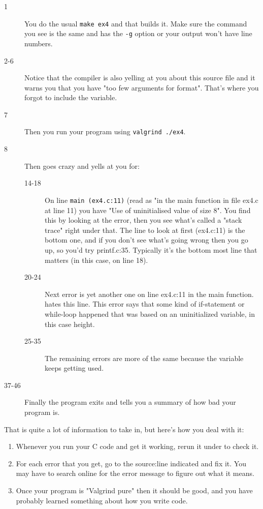 \begin{description}
\item[1] You do the usual \verb|make ex4| and that builds it. Make sure the  command
    you see is the same and has the \verb|-g| option or your  output won't
    have line numbers.
\item[2-6] Notice that the compiler is also yelling at you about this source file and it
    warns you that you have "too few arguments for format".  That's where you 
    forgot to include the  variable.
\item[7] Then you run your program using \verb|valgrind ./ex4|.
\item[8] Then  goes crazy and yells at you for:
    \begin{description}
        \item[14-18] On line \verb|main (ex4.c:11)| (read as "in the main function in
            file ex4.c at line 11) you have "Use of uninitialised value of size 8".
            You find this by looking at the error, then you see what's called a "stack trace"
            right under that.  The line to look at first (ex4.c:11) is the bottom one, 
            and if you don't see what's going wrong then you go up, so you'd try
            printf.c:35.  Typically it's the bottom most line that matters (in this case, on line 18).
        \item[20-24] Next error is yet another one on line ex4.c:11 in the main function. 
            hates this line.  This error says that some kind of if-statement or while-loop
            happened that was based on an uninitialized variable, in this case height.
        \item[25-35] The remaining errors are more of the same because the variable keeps getting
        used.
    \end{description}
\item[37-46] Finally the program exits and  tells you a summary of how bad
    your program is.
\end{description}

That is quite a lot of information to take in, but here's how you deal with it:

\begin{enumerate}
\item Whenever you run your C code and get it working, rerun it under 
    to check it.
\item For each error that you get, go to the source:line indicated and
    fix it.  You may have to search online for the error message to figure out
    what it means.
\item Once your program is "Valgrind pure" then it should be good, and you
    have probably learned something about how you write code.
\end{enumerate}

